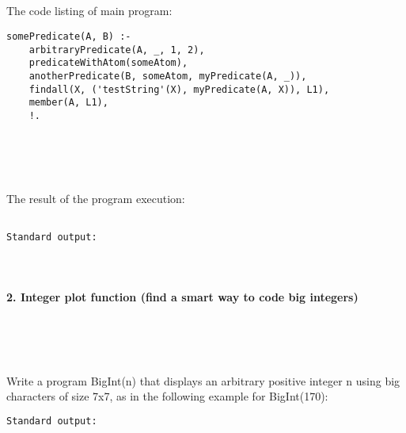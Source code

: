 \documentclass{article}
\begin{document}
\paragraph{}\
\paragraph{}\

		\rmfamily
		\noindent The code listing of main program:
		\begin{verbatim}
somePredicate(A, B) :-
    arbitraryPredicate(A, _, 1, 2),
    predicateWithAtom(someAtom),
    anotherPredicate(B, someAtom, myPredicate(A, _)),
    findall(X, ('testString'(X), myPredicate(A, X)), L1),
    member(A, L1),
    !.
		\end{verbatim}


\paragraph{}\
	
	\rmfamily\
	
		\noindent The result of the program execution:
		
	\ttfamily
	\begin{lstlisting}[language=bash]

Standard output:

	\end{lstlisting}
	
	
\paragraph{}\

	
	
	\rmfamily
	
	\paragraph{2. Integer plot function (find a smart way to code big integers) }\
	
	\rmfamily\
	
		Write a program BigInt(n) that displays an arbitrary positive integer n using big characters of size 7x7, as in the following example for BigInt(170):
				
	\ttfamily
	\begin{lstlisting}[language=bash]		
Standard output:
		 
	\end{lstlisting}
	
\end{document}
